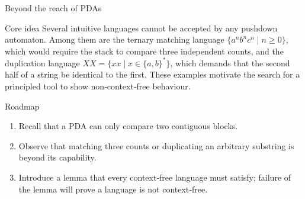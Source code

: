 \begin{frame}[t]{Beyond the reach of PDAs}
  \begin{tblock}{Core idea}
    Several intuitive languages cannot be accepted by any pushdown
    automaton.  Among them are the ternary matching language
    $\{a^n b^n c^n \mid n\ge 0\}$, which would require the stack to
    compare three independent counts, and the duplication language
    $XX = \{xx \mid x \in \{a,b\}^*\}$, which demands that the second
    half of a string be identical to the first.  These examples
    motivate the search for a principled tool to show non‑context‑free
    behaviour.
  \end{tblock}
  \begin{tblock}{Roadmap}
    \begin{enumerate}
      \item Recall that a PDA can only compare two contiguous blocks.
      \item Observe that matching three counts or duplicating an
        arbitrary substring is beyond its capability.
      \item Introduce a lemma that every context‑free language must
        satisfy; failure of the lemma will prove a language is not
        context‑free.
    \end{enumerate}
  \end{tblock}
  \label{fr:6.1-02}
\end{frame}

